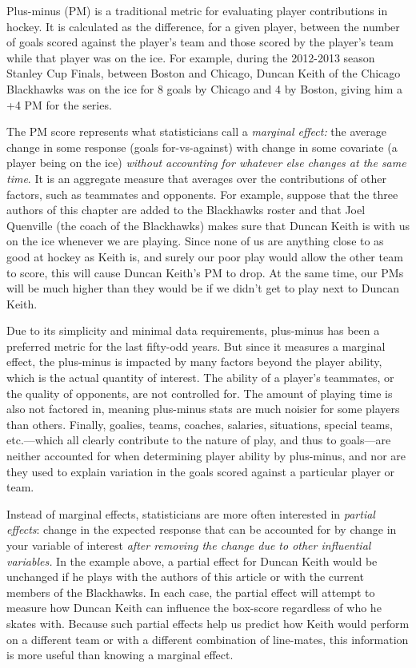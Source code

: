 Plus-minus (PM) is a traditional metric for evaluating player contributions in
hockey. It is calculated as the difference, for a given player, between the
number of goals scored against the player's team and those scored by the
player's team while that player was on the ice.  For example, during the
2012-2013 season Stanley Cup Finals, between Boston and Chicago, Duncan Keith
of the Chicago Blackhawks was on the ice for 8 goals by Chicago and 4 by
Boston, giving him a +4 PM for the series.

The PM score represents what statisticians call a \textit{marginal effect:}
the average change in some response (goals for-vs-against) with change in some
covariate (a player being on the ice) \textit{without accounting for whatever
else changes at the same time}. It is an aggregate measure that averages over
the contributions of other factors, such as teammates and opponents.   For
example, suppose that the three authors of this chapter are added to the
Blackhawks roster and that Joel Quenville (the coach of the Blackhawks) makes
sure that Duncan Keith is with us on the ice whenever we are playing.  Since
none of us are anything close to as good at hockey as Keith is, and surely our
poor play would allow the other team to score, this will cause Duncan Keith's
PM to drop.  At the same time, our PMs will be much higher than they would be
if we didn't get to play next to Duncan Keith.

Due to its simplicity and minimal data requirements, plus-minus has been a
preferred metric for the last fifty-odd years.  But since it measures a
marginal effect, the plus-minus is impacted by many factors beyond the player
ability, which is the actual quantity of interest.  The ability of a player's
teammates, or the quality of opponents, are not controlled for.  The amount of
playing time is also not factored in, meaning plus-minus stats are much
noisier for some players than others. Finally, goalies, teams, coaches,
salaries, situations, special teams, etc.---which all clearly contribute to
the nature of play, and thus to goals---are neither accounted for when
determining player ability by plus-minus, and nor are they used to explain
variation in the goals scored against a particular player or team.

Instead of marginal effects, statisticians are more often interested in
\textit{partial effects}: change in the expected response that can be
accounted for by change in your variable of interest \textit{after removing
the change due to other influential variables.} In the example above, a
partial effect for Duncan Keith would be unchanged if he plays with the
authors of this article or with the current members of the Blackhawks.  In
each case, the partial effect will attempt to measure how Duncan Keith can
influence the box-score regardless of who he skates with. Because such partial
effects help us predict how Keith would perform on a different team or with a
different combination of line-mates, this information is more useful than
knowing a marginal effect.

